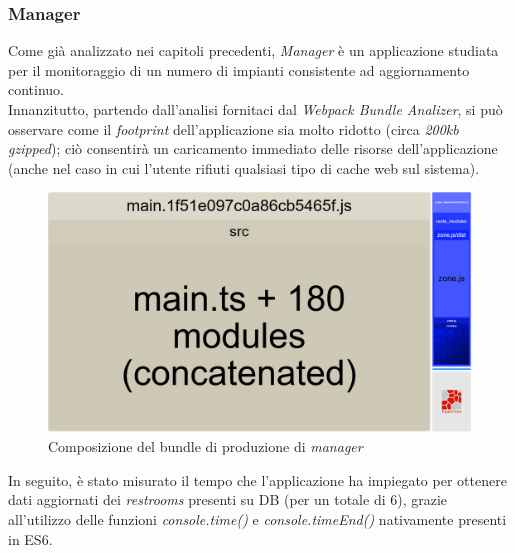 \documentclass[12pt]{article}
\begin{document}
\subsubsection{Manager}
Come già analizzato nei capitoli precedenti, \textit{Manager} è un applicazione studiata per il monitoraggio di un numero di impianti consistente ad aggiornamento continuo.\\
Innanzitutto, partendo dall'analisi fornitaci dal \textit{Webpack Bundle Analizer}\cite{bundleAnalyzer}, si può osservare come il \textit{footprint} dell'applicazione sia molto ridotto (circa \textit{200kb gzipped}); ciò consentirà un caricamento immediato delle risorse dell'applicazione (anche nel caso in cui l'utente rifiuti qualsiasi tipo di cache web sul sistema).
\begin{figure}[h!]
\centering
  \includegraphics[scale=0.18]{img/footprint-manager.png}
  \caption{Composizione del bundle di produzione di \textit{manager}}
\end{figure}
\newpage
In seguito, è stato misurato il tempo che l'applicazione ha impiegato per ottenere dati aggiornati dei \textit{restrooms} presenti su DB (per un totale di 6), grazie all'utilizzo delle funzioni \textit{console.time()} e \textit{console.timeEnd()} nativamente presenti in ES6.
\end{document}
